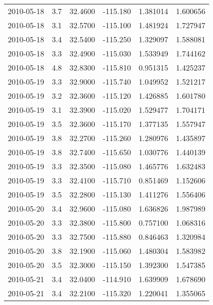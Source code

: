 \begin{tabular}{lrrrrr}
2010-05-18 &       3.7 &  32.4600 &  -115.180 &         1.381014 &         1.600656 \\
2010-05-18 &       3.1 &  32.5700 &  -115.100 &         1.481924 &         1.727947 \\
2010-05-18 &       3.4 &  32.5400 &  -115.250 &         1.329097 &         1.588081 \\
2010-05-18 &       3.3 &  32.4900 &  -115.030 &         1.533949 &         1.744162 \\
2010-05-18 &       4.8 &  32.8300 &  -115.810 &         0.951315 &         1.425237 \\
2010-05-19 &       3.3 &  32.9000 &  -115.740 &         1.049952 &         1.521217 \\
2010-05-19 &       3.2 &  32.3600 &  -115.120 &         1.426885 &         1.601780 \\
2010-05-19 &       3.1 &  32.3900 &  -115.020 &         1.529477 &         1.704171 \\
2010-05-19 &       3.5 &  32.3600 &  -115.170 &         1.377135 &         1.557947 \\
2010-05-19 &       3.8 &  32.2700 &  -115.260 &         1.280976 &         1.435897 \\
2010-05-19 &       3.8 &  32.7400 &  -115.650 &         1.030776 &         1.440139 \\
2010-05-19 &       3.3 &  32.3500 &  -115.080 &         1.465776 &         1.632483 \\
2010-05-19 &       3.3 &  32.4100 &  -115.710 &         0.851469 &         1.152606 \\
2010-05-19 &       3.5 &  32.2800 &  -115.130 &         1.411276 &         1.556406 \\
2010-05-20 &       3.4 &  32.9600 &  -115.080 &         1.636826 &         1.987989 \\
2010-05-20 &       3.3 &  32.3800 &  -115.800 &         0.757100 &         1.068316 \\
2010-05-20 &       3.3 &  32.7500 &  -115.880 &         0.846463 &         1.320984 \\
2010-05-20 &       3.8 &  32.1900 &  -115.060 &         1.480304 &         1.583982 \\
2010-05-20 &       3.5 &  32.3000 &  -115.150 &         1.392300 &         1.547385 \\
2010-05-21 &       3.4 &  32.0400 &  -114.910 &         1.639909 &         1.678690 \\
2010-05-21 &       3.4 &  32.2100 &  -115.320 &         1.220041 &         1.355065 \\

\end{tabular}
